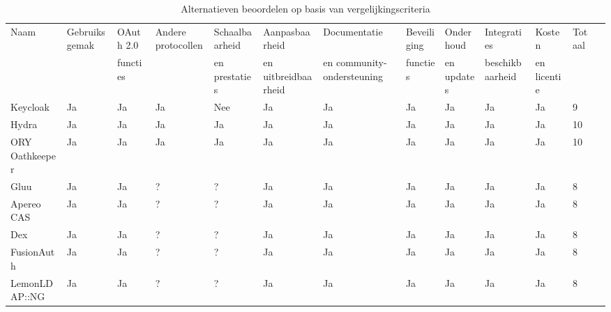 \begin{table}[htbp]
  \centering
  \caption{Alternatieven beoordelen op basis van vergelijkingscriteria}
  \label{tab:oauth_servers}
  \begin{adjustbox}{width=1\textwidth}
  \begin{tabular}{@{}lllllllllllll@{}}
    \toprule
    Naam          & Gebruiksgemak & OAuth 2.0 & Andere protocollen & Schaalbaarheid & Aanpasbaarheid & Documentatie & Beveiliging & Onderhoud & Integraties & Kosten & Totaal \\ 
                   &                & functies &                     & en prestaties   & en uitbreidbaarheid & en community-ondersteuning & functies & en updates & beschikbaarheid & en licentie &        \\
    \midrule
    Keycloak      & Ja             & Ja        & Ja                  & Nee             & Ja               & Ja             & Ja         & Ja         & Ja             & Ja          & 9      \\
    Hydra         & Ja             & Ja        & Ja                  & Ja              & Ja               & Ja             & Ja         & Ja         & Ja             & Ja          & 10      \\
    ORY Oathkeeper & Ja            & Ja        & Ja                  & Ja              & Ja               & Ja             & Ja         & Ja         & Ja             & Ja          & 10      \\
    Gluu          & Ja             & Ja        & ?                   & ?               & Ja               & Ja             & Ja         & Ja         & Ja             & Ja          & 8      \\
    Apereo CAS    & Ja             & Ja        & ?                   & ?               & Ja               & Ja             & Ja         & Ja         & Ja             & Ja          & 8      \\
    Dex           & Ja             & Ja        & ?                   & ?               & Ja               & Ja             & Ja         & Ja         & Ja             & Ja          & 8      \\
    FusionAuth    & Ja             & Ja        & ?                   & ?               & Ja               & Ja             & Ja         & Ja         & Ja             & Ja          & 8      \\
    LemonLDAP::NG & Ja             & Ja        & ?                   & ?               & Ja               & Ja             & Ja         & Ja         & Ja             & Ja          & 8      \\

\end{tabular}
\end{adjustbox}
\end{table}

